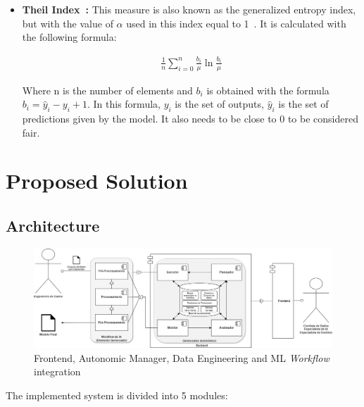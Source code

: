 \documentclass[runningheads]{llncs}
\begin{document}
\begin{itemize}
\item \textbf{Theil Index~\citep{Speicher_2018}:} This measure is also known as the generalized entropy index, but with the value of $\alpha$ used in this index equal to 1~\citep{Speicher_2018}. It is calculated with the following formula:

\begin{align*}
\frac{1}{n}\sum^{n}_{i=0}\frac{b_i}{\mu}\ln{\frac{b_i}{\mu}}
\end{align*}

Where n is the number of elements and $b_i$ is obtained with the formula $b_i = \hat{y}_i - y_i + 1$. In this formula, $y_i$ is the set of outputs, $\hat{y}_i$ is the set of predictions given by the model. It also needs to be close to 0 to be considered fair.

\end{itemize}

\section{Proposed Solution}

\subsection{Architecture}

\begin{figure}[h]
\centering
\includegraphics[scale=0.3]{images/backend-frontend-ml.jpg}
\caption {Frontend, Autonomic Manager, Data Engineering and ML \textit{Workflow} integration}
\label{fig:BackendFrontendML}
\end{figure}

The implemented system is divided into 5 modules:
\end{document}
